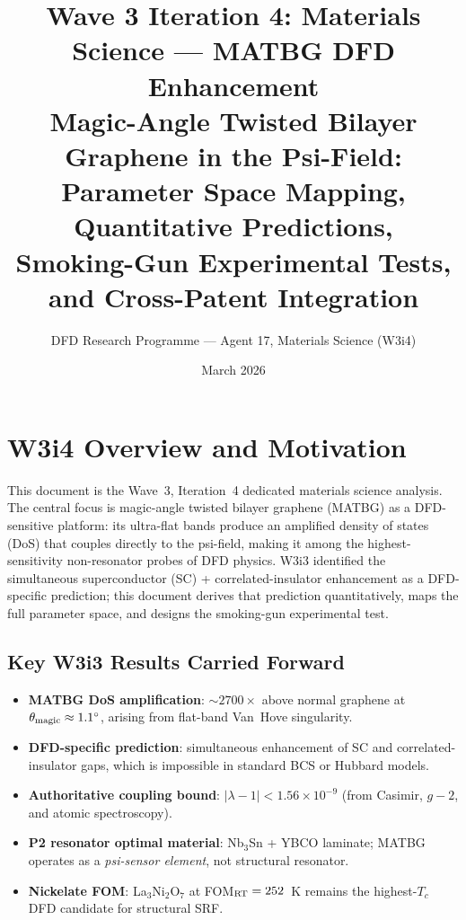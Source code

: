 \documentclass[11pt]{article}
\title{Wave 3 Iteration 4: Materials Science --- MATBG DFD Enhancement\\
\large Magic-Angle Twisted Bilayer Graphene in the Psi-Field:\\
Parameter Space Mapping, Quantitative Predictions,\\
Smoking-Gun Experimental Tests, and Cross-Patent Integration}
\author{DFD Research Programme --- Agent 17, Materials Science (W3i4)}
\date{March 2026}
\newcommand{\ee}[1]{\times 10^{#1}}
\newcommand{\tmagic}{\theta_{\rm magic}}
\newcommand{\lambdabound}{1.56\ee{-9}}
\begin{document}
\maketitle
\tableofcontents
\newpage

\section{W3i4 Overview and Motivation}
\label{sec:overview}

This document is the Wave~3, Iteration~4 dedicated materials science
analysis. The central focus is magic-angle twisted bilayer graphene (MATBG)
as a DFD-sensitive platform: its ultra-flat bands produce an amplified
density of states (DoS) that couples directly to the psi-field, making it
among the highest-sensitivity non-resonator probes of DFD physics. W3i3
identified the simultaneous superconductor (SC) + correlated-insulator
enhancement as a DFD-specific prediction; this document derives that
prediction quantitatively, maps the full parameter space, and designs the
smoking-gun experimental test.

\subsection{Key W3i3 Results Carried Forward}

\begin{itemize}
  \item \textbf{MATBG DoS amplification}: $\sim 2700\times$ above normal
    graphene at $\tmagic \approx 1.1^\circ$, arising from flat-band
    Van~Hove singularity.
  \item \textbf{DFD-specific prediction}: simultaneous enhancement of SC
    and correlated-insulator gaps, which is impossible in standard BCS or
    Hubbard models.
  \item \textbf{Authoritative coupling bound}: $|\lambda-1| < \lambdabound$
    (from Casimir, $g-2$, and atomic spectroscopy).
  \item \textbf{P2 resonator optimal material}: Nb$_3$Sn + YBCO laminate;
    MATBG operates as a \emph{psi-sensor element}, not structural resonator.
  \item \textbf{Nickelate FOM}: La$_3$Ni$_2$O$_7$ at FOM$_{\rm RT} = 252$~K
    remains the highest-$T_c$ DFD candidate for structural SRF.
\end{itemize}
\end{document}
